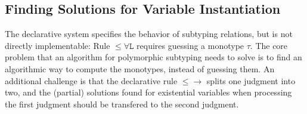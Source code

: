 
\begin{comment}
The conclusions of the declarative subtyping rules do not overlap with
each other, except for the judgments with a shape of
$\forall a. A \le \forall a. B$. In this case, an eager application of
Rule~$\mathtt{{\le}\forall R}$ introduces type variable into the context
earlier, which results in an easier problem than the application of
Rule~$\mathtt{{\le}\forall L}$.
\end{comment}

\subsection{Finding Solutions for Variable Instantiation}

The declarative system specifies the behavior of subtyping relations,
but is not directly implementable: Rule $\mathtt{{\le}\forall L}$
requires guessing a monotype $\tau$.
The core problem that an algorithm for polymorphic 
subtyping needs to solve is to find an algorithmic way to compute the 
monotypes, instead of guessing them. An additional challenge is that
the declarative rule $\mathtt{{\le}{\to}}$ splits one judgment
into two, and the (partial) solutions found for existential variables when
processing the first judgment should be transfered to the second judgment.

